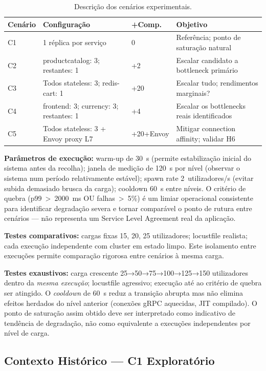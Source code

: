 \documentclass[acmsmall,screen=true,nonacm]{acmart}
\begin{document}
\begin{table}[h]
\caption{Descrição dos cenários experimentais.}
\label{tab:cenarios}
\begin{tabular}{p{1cm}p{2.5cm}p{1cm}p{2.5cm}}
\toprule
\textbf{Cenário} & \textbf{Configuração} & \textbf{+Comp.} & \textbf{Objetivo} \\
\midrule
C1 & 1 réplica por serviço & 0 & Referência; ponto de saturação natural \\
C2 & productcatalog: 3; restantes: 1 & +2 & Escalar candidato a bottleneck primário \\
C3 & Todos stateless: 3; redis-cart: 1 & +20 & Escalar tudo; rendimentos marginais? \\
C4 & frontend: 3; currency: 3; restantes: 1 & +4 & Escalar os bottlenecks reais identificados \\
C5 & Todos stateless: 3 + Envoy proxy L7 & +20+Envoy & Mitigar connection affinity; validar H6 \\
\bottomrule
\end{tabular}
\end{table}

\textbf{Parâmetros de execução:} warm-up de 30~s (permite estabilização inicial do sistema antes da recolha); janela de medição de 120~s por nível (observar o sistema num período relativamente estável); spawn rate 2~utilizadores/s (evitar subida demasiado brusca da carga); cooldown 60~s entre níveis. O critério de quebra (p99~>~2000~ms OU falhas~>~5\%) é um limiar operacional consistente para identificar degradação severa e tornar comparável o ponto de rutura entre cenários — não representa um Service Level Agreement real da aplicação.

\textbf{Testes comparativos:} cargas fixas 15, 20, 25 utilizadores; locustfile realista; cada execução independente com cluster em estado limpo. Este isolamento entre execuções permite comparação rigorosa entre cenários à mesma carga.

\textbf{Testes exaustivos:} carga crescente 25→50→75→100→125→150 utilizadores dentro da \emph{mesma execução}; locustfile agressivo; execução até ao critério de quebra ser atingido. O \textit{cooldown} de 60~s reduz a transição abrupta mas não elimina efeitos herdados do nível anterior (conexões gRPC aquecidas, JIT compilado). O ponto de saturação assim obtido deve ser interpretado como indicativo de tendência de degradação, não como equivalente a execuções independentes por nível de carga.

\subsection{Contexto Histórico — C1 Exploratório}
\end{document}

